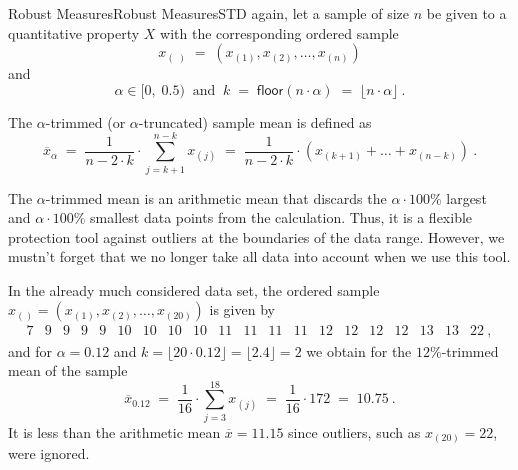 \begin{MXContent}{Robust Measures}{Robust Measures}{STD}
again, let a sample of size $n$ be given to a quantitative property $X$ with the corresponding 
ordered sample  
$$
x_{(\; )}\;=\;(x_{(1)},x_{(2)},\ldots ,x_{(n)})
$$
and
$$
\alpha \in [0,\;0.5)\;\; \text{and}\;\;k\;=\;\textsf{floor}(n\cdot \alpha) \;= \;\lfloor n\cdot \alpha \rfloor \: .
$$

\begin{MInfo}
The $\alpha$-trimmed (or $\alpha$-truncated) sample mean is defined as
$$
\overline{x}_{\alpha}\;=\;
\frac{1}{n-2\cdot k} \cdot \sum\limits_{j=k+1}^{n-k}x_{(j)}\;=\; \frac{1}{n-2\cdot k}\cdot \left(x_{(k+1)}+ \ldots + x_{(n-k)} \right)\: .
$$
\end{MInfo}

The $\alpha$-trimmed mean is an arithmetic mean that discards the $\alpha \cdot 100\%$ largest 
and $\alpha \cdot 100\%$ smallest data points from the calculation. Thus, it is a flexible protection tool 
against outliers at the boundaries of the data range. However, we mustn't forget that we no longer take all data into account when we use this tool.

\begin{MExample}
In the already much considered data set, the ordered sample 
 $x_{()}=(x_{(1)},x_{(2)},\ldots ,x_{(20)})$ is given by 
$$
\begin{array}{cccccccccccccccccccc} 7 & 9 & 9 & 9 & 9 & 10 & 10 & 10 & 10 & 11 & 11 & 11 & 11 & 12 & 12 & 12 & 12 & 13 & 13 & 22 \: ,\end{array}
$$
and for
$\alpha = 0.12$ and $k=\lfloor 20\cdot 0.12 \rfloor = \lfloor 2.4 \rfloor =2$ we obtain for the $12\%$-trimmed mean of the sample
$$
\overline{x}_{0.12} \;=\; \frac{1}{16}\cdot \sum\limits_{j=3}^{18}x_{(j)}\;=\; \frac{1}{16}\cdot 172\;=\;10.75\: .
$$
It is less than the arithmetic mean $\overline{x}=11.15$ since outliers, such as $x_{(20)}=22$, were ignored.
\end{MExample}

\end{MXContent}


